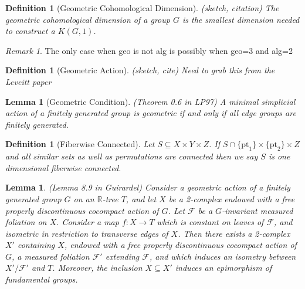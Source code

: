 \documentclass{article}
\theoremstyle{mystyle}
\newtheorem{lem}[thm]{Lemma}
\newtheorem{defn}[thm]{Definition}
\theoremstyle{remark}
\newtheorem{rmk}{Remark}[section]
\begin{document}
\begin{defn}
    [Geometric Cohomological Dimension]
    (sketch, citation)
    The geometric cohomological dimension of a group $G$ is the smallest dimension needed to construct a $K(G,1)$.
\end{defn}

\begin{rmk}
    The only case when geo is not alg is possibly when geo=3 and alg=2
\end{rmk}
 \begin{defn}
     [Geometric Action]
     \label{defn:geometricaction}
     (sketch, cite)
     Need to grab this from the Leveitt paper
 \end{defn}
\begin{lem}
    [Geometric Condition]
    \label{lem:simpgeo} 
    (Theorem 0.6 in LP97)
    A minimal simplicial action of a finitely generated group is geometric if and only if all edge groups are finitely generated.
\end{lem}
\begin{defn}
    [Fiberwise Connected]
    \label{def:connfibers} 
    Let \(S \subseteq X \times Y \times Z\). If \(S \cap \{\text{pt}_1\} \times \{\text{pt}_2\} \times Z\) and all similar sets as well as permutations are connected then we say \(S\) is one dimensional fiberwise connected.
\end{defn}
\begin{lem}
    \label{lem:guirardel-extension}
    (Lemma 8.9 in Guirardel)
    Consider a geometric action of a finitely generated group \(G\) on an \(\mathbb{R}\)-tree \(T\), and let \(X\) be a 2-complex endowed with a free properly discontinuous cocompact action of \(G\). Let \(\mathscr{F}\) be a \(G\)-invariant measured foliation on \(X\). Consider a map \(f: X \to T\) which is constant on leaves of \(\mathscr{F}\), and isometric in restriction to transverse edges of \(X\). Then there exists a 2-complex \( X'\) containing \(X\), endowed with a free properly discontinuous cocompact action of \(G\), a measured foliation \(\mathscr{F} '\) extending \(\mathscr{F}\), and which induces an isometry between \(X'/ \mathscr{F}'\) and \(T\). Moreover, the inclusion \(X \subseteq X'\) induces an epimorphism of fundamental groups.
\end{lem}
\end{document}
